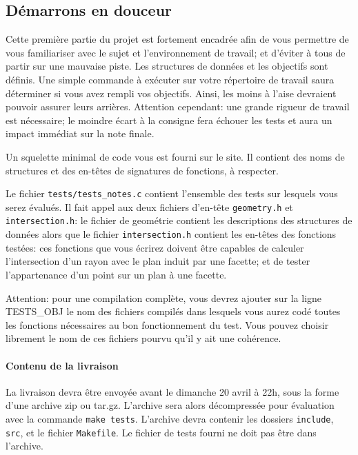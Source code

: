 \documentclass[10pt, a4paper ]{article}
\begin{document}
\subsection{Démarrons en douceur }
\label{sec:unit}

Cette première partie du projet est fortement encadrée afin de vous permettre de
vous familiariser avec le sujet et l'environnement de travail; et d'éviter à
tous de partir sur une mauvaise piste. Les structures de données et les
objectifs sont définis.  Une simple commande à exécuter sur votre répertoire de
travail saura déterminer si vous avez rempli vos objectifs. Ainsi, les moins à
l'aise devraient pouvoir assurer leurs arrières.  Attention cependant: une
grande rigueur de travail est nécessaire; le moindre écart à la consigne fera
échouer les tests et aura un impact immédiat sur la note finale.

Un squelette minimal de code vous est fourni sur le site. Il contient des noms
de structures et des en-têtes de signatures de fonctions, à respecter.

Le fichier \texttt{tests/tests\_notes.c} contient l'ensemble des tests sur
lesquels vous serez évalués. Il fait appel aux deux fichiers d'en-tête
\texttt{geometry.h} et \texttt{intersection.h}: le fichier de geométrie contient
les descriptions des structures de données alors que le fichier
\texttt{intersection.h} contient les en-têtes des fonctions testées: ces
fonctions que vous écrirez doivent être capables de calculer l'intersection d'un
rayon avec le plan induit par une facette; et de tester l'appartenance d'un
point sur un plan à une facette.

Attention: pour une compilation complète, vous devrez ajouter sur la ligne
\textsf{TESTS\_OBJ} le nom des fichiers compilés dans lesquels vous aurez codé
toutes les fonctions nécessaires au bon fonctionnement du test. Vous pouvez
choisir librement le nom de ces fichiers pourvu qu'il y ait une cohérence.

\paragraph{Contenu de la livraison} La livraison devra être envoyée avant le
dimanche 20 avril à 22h, sous la forme d'une archive zip ou tar.gz. L'archive
sera alors décompressée pour évaluation avec la commande \texttt{make tests}.
L'archive devra contenir les dossiers \texttt{include}, \texttt{src}, et le
fichier \texttt{Makefile}. Le fichier de tests fourni ne doit pas être dans
l'archive.
\end{document}
